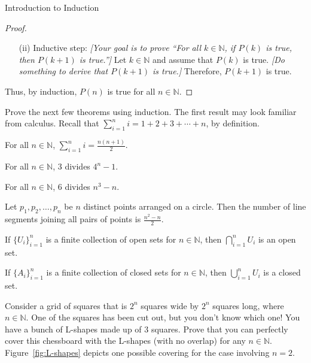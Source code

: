 \begin{section}{Introduction to Induction}
\begin{skeleton}
\begin{center}
{\begin{minipage}{6in}
\begin{proof}
\begin{enumerate}
\item[(ii)] Inductive step:  \emph{[Your goal is to prove ``For all $k\in\mathbb{N}$, if $P(k)$ is true, then $P(k+1)$ is true.'']} Let $k\in\mathbb{N}$ and assume that $P(k)$ is true. \emph{[Do something to derive that $P(k+1)$ is true.]} Therefore, $P(k+1)$ is true.
\end{enumerate}
Thus, by induction, $P(n)$ is true for all $n\in\mathbb{N}$.
\end{proof}
\end{minipage}
}
\end{center}
\end{skeleton}

Prove the next few theorems using induction.  The first result may look familiar from calculus. Recall that $\displaystyle \sum_{i=1}^{n}i=1+2+3+\cdots +n$, by definition.

\begin{theorem}
For all $n\in\mathbb{N}$, $\displaystyle \sum_{i=1}^{n}i=\frac{n(n+1)}{2}$.
\end{theorem}

\begin{theorem}
For all $n\in\mathbb{N}$, 3 divides $4^{n}-1$.
\end{theorem}

\begin{theorem}
For all $n\in\mathbb{N}$, 6 divides $n^{3}-n$.
\end{theorem}

\begin{theorem}
Let $p_{1}, p_{2}, \ldots, p_{n}$ be $n$ distinct points arranged on a circle.  Then the number of line segments joining all pairs of points is $\frac{n^{2}-n}{2}$.
\end{theorem}

\begin{theorem}
If $\{U_{i}\}_{i=1}^n$ is a finite collection of open sets for $n\in \mathbb{N}$, then $\bigcap_{i=1}^n U_{i}$ is an open set.
\end{theorem}

\begin{theorem}
If $\{A_{i}\}_{i=1}^n$ is a finite collection of closed sets for $n\in \mathbb{N}$, then $\bigcup_{i=1}^n U_{i}$ is a closed set.
\end{theorem}

\begin{problem}\label{prob:L-shapes}
Consider a grid of squares that is $2^n$ squares wide by $2^n$ squares long, where $n\in\mathbb{N}$. One of the squares has been cut out, but you don't know which one!  You have a bunch of L-shapes made up of $3$ squares.  Prove that you can perfectly cover this chessboard with the L-shapes (with no overlap) for any $n\in\mathbb{N}$. Figure~\ref{fig:L-shapes} depicts one possible covering for the case involving $n=2$.
\end{problem}


\end{section}
